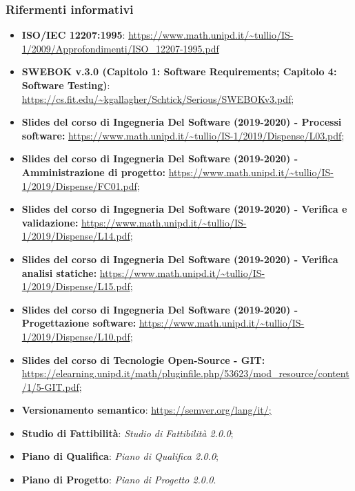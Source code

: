 \subsubsection{Rifermenti informativi}
\begin{itemize}
  \item \textbf{ISO/IEC 12207:1995}: \url{https://www.math.unipd.it/~tullio/IS-1/2009/Approfondimenti/ISO_12207-1995.pdf}
  \item \textbf{SWEBOK v.3.0 (Capitolo 1: Software Requirements; Capitolo 4: Software Testing)}: \url{https://cs.fit.edu/~kgallagher/Schtick/Serious/SWEBOKv3.pdf};
  \item \textbf{Slides del corso di Ingegneria Del Software (2019-2020) - Processi software:} \url{https://www.math.unipd.it/~tullio/IS-1/2019/Dispense/L03.pdf};
  \item \textbf{Slides del corso di Ingegneria Del Software (2019-2020) - Amministrazione di progetto:} \url{https://www.math.unipd.it/~tullio/IS-1/2019/Dispense/FC01.pdf};
  \item \textbf{Slides del corso di Ingegneria Del Software (2019-2020) - Verifica e validazione:} \url{https://www.math.unipd.it/~tullio/IS-1/2019/Dispense/L14.pdf};
  \item \textbf{Slides del corso di Ingegneria Del Software (2019-2020) - Verifica analisi statiche:} \url{https://www.math.unipd.it/~tullio/IS-1/2019/Dispense/L15.pdf};
  \item \textbf{Slides del corso di Ingegneria Del Software (2019-2020) - Progettazione software:}
  \url{  https://www.math.unipd.it/~tullio/IS-1/2019/Dispense/L10.pdf};
  \item \textbf{Slides del corso di Tecnologie Open-Source - GIT:}   \url{  https://elearning.unipd.it/math/pluginfile.php/53623/mod_resource/content/1/5-GIT.pdf};
  \item \textbf{Versionamento semantico}: \url{https://semver.org/lang/it/;}
  \item \textbf{Studio di Fattibilità}: \textit{Studio di Fattibilità 2.0.0\docs};
  \item \textbf{Piano di Qualifica}: \textit{Piano di Qualifica 2.0.0\docs};
  \item \textbf{Piano di Progetto}: \textit{Piano di Progetto 2.0.0\docs}.
\end{itemize}
